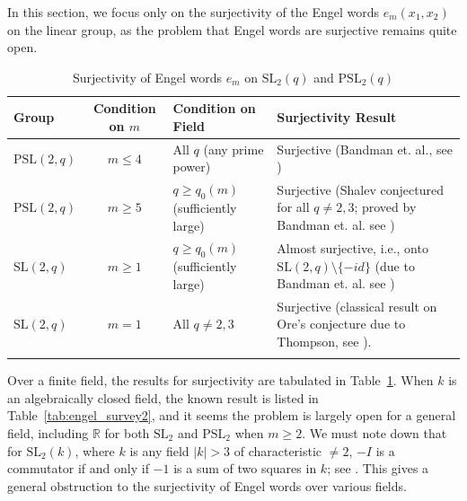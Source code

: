 \documentclass[10pt,twoside]{amsart}
\newcommand{\SL}{\mathrm{SL}}
\theoremstyle{definition}
\theoremstyle{definition}
\begin{document}
In this section, we focus only on the surjectivity of the Engel words $e_m(x_1, x_2)$ on the linear group, as the problem that Engel words are surjective remains quite open. 

\begin{table}[htbp]\caption{Surjectivity of Engel words \( e_m \) on $\SL_2(q)$ and $\mathrm{PSL_2}(q)$}\label{tab:engel_survey1}
\centering
\small 
\begin{tabular}{@{} l c p{4cm} p{7cm} @{}}
\toprule
\textbf{Group} & \textbf{Condition on \( m \)} & \textbf{Condition on Field} & \textbf{Surjectivity Result} \\
\midrule
\( \text{PSL}(2, q) \) & \( m \leq 4 \) & All \( q \) (any prime power) & Surjective (Bandman et. al., see \cite{BandmanGarionGrunewald2012}) \\
\addlinespace
\( \text{PSL}(2, q) \) & \( m \geq 5 \) & \( q \geq q_0(m) \) (sufficiently large) & Surjective (Shalev conjectured for all \( q \neq 2, 3\); proved by Bandman et. al. see \cite{BandmanGarionGrunewald2012}) \\
\addlinespace
\( \text{SL}(2, q) \) & \( m \geq 1 \) &  \( q \geq q_0(m) \) (sufficiently large) & Almost surjective, i.e., onto \( \text{SL}(2, q) \setminus \{-id\} \) (due to Bandman et. al. see \cite{BandmanGarionGrunewald2012}) \\
\addlinespace
\( \text{SL}(2, q) \) & \( m =1 \) & All \( q \neq 2, 3 \) & Surjective (classical result on Ore's conjecture due to Thompson, see \cite{Thompson1961}). \\
\addlinespace
\bottomrule
\end{tabular}
\end{table}
\noindent Over a finite field, the results for surjectivity are tabulated in Table~\ref{tab:engel_survey1}. When $k$ is an algebraically closed field, the known result is listed in Table~\ref{tab:engel_survey2}, and it seems the problem is largely open for a general field, including $\mathbb R$ for both $\SL_2$ and $\mathrm{PSL_2}$ when $m\geq 2$. We must note down that for $\SL_2(k)$, where $k$ is any field $|k|> 3$ of characteristic $\neq 2$, $-I$ is a commutator if and only if $-1$ is a sum of two squares in $k$; see \cite[theorem 1]{Thompson1961}. This gives a general obstruction to the surjectivity of Engel words over various fields.   
\end{document}
